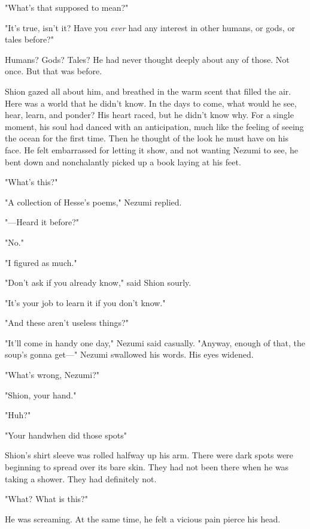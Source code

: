 "What's that supposed to mean?"

"It's true, isn't it? Have you \emph{ever} had any interest in other humans, or
gods, or tales before?"

Humans? Gods? Tales? He had never thought deeply about any of those. Not
once. But that was before.

Shion gazed all about him, and breathed in the warm scent that filled
the air. Here was a world that he didn't know. In the days to come, what
would he see, hear, learn, and ponder? His heart raced, but he didn't
know why. For a single moment, his soul had danced with an anticipation,
much like the feeling of seeing the ocean for the first time. Then he
thought of the look he must have on his face. He felt embarrassed for
letting it show, and not wanting Nezumi to see, he bent down and
nonchalantly picked up a book laying at his feet.

"What's this?"

"A collection of Hesse's poems," Nezumi replied.


"---Heard it before?"

"No."

"I figured as much."

"Don't ask if you already know," said Shion sourly.

"It's your job to learn it if you don't know."

"And these aren't useless things?"

"It'll come in handy one day," Nezumi said casually. "Anyway, enough of
that, the soup's gonna get---" Nezumi swallowed his words. His eyes
widened.

"What's wrong, Nezumi?"

"Shion, your hand."

"Huh?"

"Your hand\el when did those spots\el "

Shion's shirt sleeve was rolled halfway up his arm. There were dark
spots were beginning to spread over its bare skin. They had not been
there when he was taking a shower. They had definitely not.

"What? What is this?"

He was screaming. At the same time, he felt a vicious pain pierce his
head.

